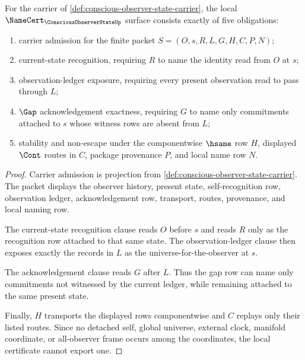 \begin{theorem}
\label{thm:conscious-observer-state-namecert-obligations}
For the carrier of \autoref{def:conscious-observer-state-carrier}, the local $\NameCert_{\ConsciousObserverStateUp}$ surface consists exactly of five obligations:
\begin{enumerate}
\item carrier admission for the finite packet $S=(O,s,R,L,G,H,C,P,N)$;
\item current-state recognition, requiring $R$ to name the identity read from $O$ at $s$;
\item observation-ledger exposure, requiring every present observation read to pass through $L$;
\item $\Gap$ acknowledgement exactness, requiring $G$ to name only commitments attached to $s$ whose witness rows are absent from $L$;
\item stability and non-escape under the componentwise $\hsame$ row $H$, displayed $\Cont$ routes in $C$, package provenance $P$, and local name row $N$.
\end{enumerate}
\end{theorem}
\begin{proof}
Carrier admission is projection from \autoref{def:conscious-observer-state-carrier}. The packet displays the observer history, present state, self-recognition row, observation ledger, acknowledgement row, transport, routes, provenance, and local naming row.

The current-state recognition clause reads $O$ before $s$ and reads $R$ only as the recognition row attached to that same state. The observation-ledger clause then exposes exactly the records in $L$ as the universe-for-the-observer at $s$.

The acknowledgement clause reads $G$ after $L$. Thus the gap row can name only commitments not witnessed by the current ledger, while remaining attached to the same present state.

Finally, $H$ transports the displayed rows componentwise and $C$ replays only their listed routes. Since no detached self, global universe, external clock, manifold coordinate, or all-observer frame occurs among the coordinates, the local certificate cannot export one.
\end{proof}

